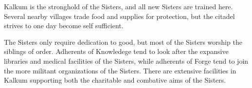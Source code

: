 Kalkum is the stronghold of the Sisters, and all new Sisters are trained here.
Several nearby villages trade food and supplies for protection, but the citadel strives to one day become self sufficient.

The Sisters only require dedication to good, but most of the Sisters worship the siblings of order.
Adherents of Knowledege tend to look after the expansive libraries and medical facilities of the Sisters, while adherents of Forge tend to join the more militant organizations of the Sisters.
There are extensive facilities in Kalkum supporting both the charitable and combative aims of the Sisters.
